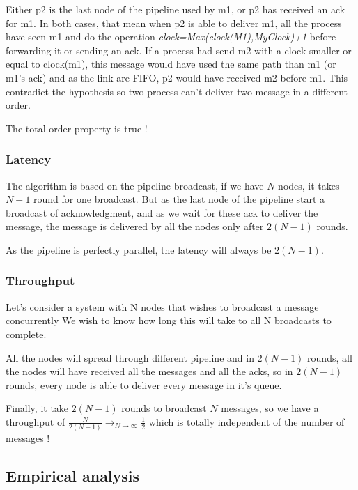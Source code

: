 \documentclass[a4paper]{article}
\begin{document}
\begin{itemize}
        Either p2 is the last node of the pipeline used by m1, or p2 has
        received an ack for m1. In both cases, that mean when p2 is able to
        deliver m1, all the process have seen m1 and do the operation 
        \textit{clock=Max(clock(M1),MyClock)+1} before forwarding it or 
        sending an ack. If a process had send
        m2 with a clock smaller or equal to clock(m1), this message would have
        used the same path than m1 (or m1's ack) and as the link are FIFO, p2
        would have received m2 before m1. This contradict the hypothesis so two
        process can't deliver two message in a different order.

        The total order property is true !

\end{itemize}
\label{sec:pipelineack-proof}


\subsubsection*{Latency}
The algorithm is based on the pipeline broadcast, if we have $N$ nodes, it takes
$N-1$ round for one broadcast. But as the last node of the pipeline start a
broadcast of acknowledgment, and as we wait for these ack to deliver the
message, the message is delivered by all the nodes only after $2(N-1)$ rounds.

As the pipeline is perfectly parallel, the latency will always be $2(N-1)$.
\subsubsection*{Throughput}
Let’s consider a system with N nodes that wishes to broadcast a message concurrently
We wish to know how long this will take to all N broadcasts to
complete.

All the nodes will spread through different pipeline and in $2(N-1)$ rounds, all the
nodes will have received all the messages and all the acks, so in $2(N-1)$ rounds,
every node is able to deliver every message in it's queue.

Finally, it take $2(N-1)$ rounds to broadcast $N$ messages, so we have a throughput
of $\frac{N}{2(N-1)}\longrightarrow_{N \rightarrow \infty}\frac{1}{2}$ which is totally independent of the number of
messages !
\subsection{Empirical analysis}
\end{document}
